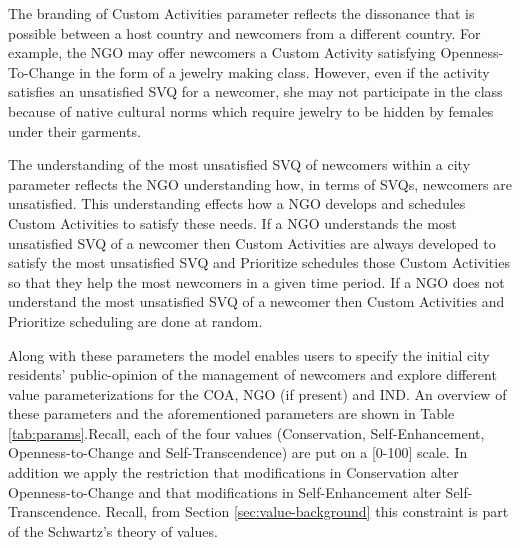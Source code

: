 \documentclass{scspaperproc}
\theoremstyle{scsthe}
\begin{document}
The branding of Custom Activities parameter reflects the dissonance that is possible between a host country and newcomers from a different country. For example, the NGO may offer newcomers a Custom Activity satisfying Openness-To-Change in the form of a jewelry making class. However, even if the activity satisfies an unsatisfied SVQ for a newcomer, she may not participate in the class because of native cultural norms which require jewelry to be hidden by females under their garments.

The understanding of the most unsatisfied SVQ of newcomers within a city parameter reflects the NGO understanding how, in terms of SVQs, newcomers are unsatisfied. This understanding effects how a NGO develops and schedules Custom Activities to satisfy these needs. If a NGO understands the most unsatisfied SVQ of a newcomer then Custom Activities are always developed to satisfy the most unsatisfied SVQ and Prioritize schedules those Custom Activities so that they help the most newcomers in a given time period. If a NGO does not understand the most unsatisfied SVQ of a newcomer then Custom Activities and Prioritize scheduling are done at random.

Along with these parameters the model enables users to specify the initial city residents' public-opinion of the management of newcomers and explore different value parameterizations for the COA, NGO (if present) and IND. An overview of these parameters and the aforementioned parameters are shown in Table \ref{tab:params}.Recall, each of the four values (Conservation, Self-Enhancement, Openness-to-Change and Self-Transcendence) are put on a [0-100] scale. In addition we apply the restriction that modifications in Conservation alter Openness-to-Change and that modifications in Self-Enhancement alter Self-Transcendence. Recall, from Section \ref{sec:value-background} this constraint is part of the Schwartz's theory of values.
\end{document}
